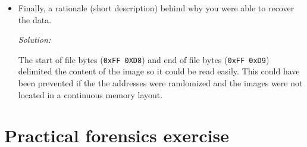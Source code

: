 \documentclass[a4paper,11pt]{article}
\newenvironment{solution}%
{\par{\noindent\small\textit{Solution:}}\vspace{-12pt}\begin{framed}}%
{\end{framed}\par}
\begin{document}
\begin{itemize}
\begin{solution}
\begin{lstlisting}[language=C]
  do_write("topsecret.jpg", 0);
  do_write("password.jpg", 1);

  return 0;
}
\end{lstlisting}
Note: the program was specifically designed to recover $2$ images. If the number of images was
unknown then it would have been necessary to dynamically allocate the vectors with the image contents.
\end{solution}
\fi


\item Finally, a rationale (short description) behind why you were able to
  recover the data.
\ifsolution
\begin{solution}
The start of file bytes (\texttt{0xFF 0XD8}) and end of file bytes (\texttt{0xFF 0xD9}) delimited
the content of the image so it could be read easily. This could have been prevented if the the
addresses were randomized and the images were not located in a continuous memory layout.
\end{solution}
\fi

\end{itemize}



\section{Practical forensics exercise}
\end{document}

